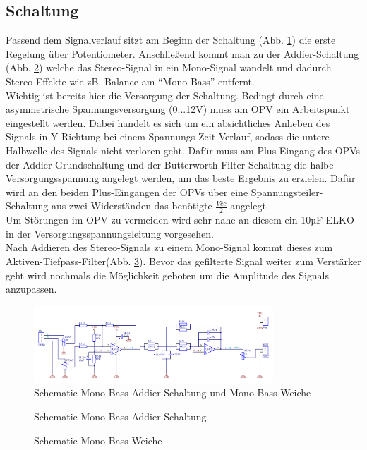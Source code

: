 \subsection{Schaltung}\label{kap:5.1.5}
Passend dem Signalverlauf sitzt am Beginn der Schaltung (Abb. \ref{fig:abb5.1.5.1}) die erste Regelung über Potentiometer. Anschließend kommt man zu der Addier-Schaltung (Abb. \ref{fig:abb5.1.5.2}) welche das Stereo-Signal in ein Mono-Signal wandelt und dadurch Stereo-Effekte wie zB. Balance am \enquote{Mono-Bass} entfernt.\\
Wichtig ist bereits hier die Versorgung der Schaltung. Bedingt durch eine asymmetrische Spannungsversorgung (0...12V) muss am OPV ein Arbeitspunkt eingestellt werden. Dabei handelt es sich um ein absichtliches Anheben des Signals in Y-Richtung bei einem Spannungs-Zeit-Verlauf, sodass die untere Halbwelle des Signals nicht verloren geht. Dafür muss am Plus-Eingang des OPVs der Addier-Grundschaltung und der Butterworth-Filter-Schaltung die halbe Versorgungsspannung angelegt werden, um das beste Ergebnis zu erzielen. Dafür wird an den beiden Plus-Eingängen der OPVs über eine Spannungsteiler-Schaltung aus zwei Widerständen das benötigte $\frac{Vcc}{2}$ angelegt.\\
Um Störungen im OPV zu vermeiden wird sehr nahe an diesem ein 10µF ELKO in der Versorgungsspannungsleitung vorgesehen.\\
Nach Addieren des Stereo-Signals zu einem Mono-Signal kommt dieses zum Aktiven-Tiefpass-Filter(Abb. \ref{fig:abb5.1.5.3}). Bevor das gefilterte Signal weiter zum Verstärker geht wird nochmals die Möglichkeit geboten um die Amplitude des Signals anzupassen.
\begin{figure} [h]
	\centering
	\includegraphics[width=0.8\textwidth]{img/Print3/3mTTWeicheruAddiererDiplSchematic.PNG}
	\caption{Schematic Mono-Bass-Addier-Schaltung und Mono-Bass-Weiche}
	\label {fig:abb5.1.5.1}
\end{figure}
\begin{figure} [h]
	\centering
	\caption{Schematic Mono-Bass-Addier-Schaltung}
	\label {fig:abb5.1.5.2}
\end{figure}
\begin{figure} [h]
	\centering
	\caption{Schematic Mono-Bass-Weiche}
	\label {fig:abb5.1.5.3}
\end{figure}


